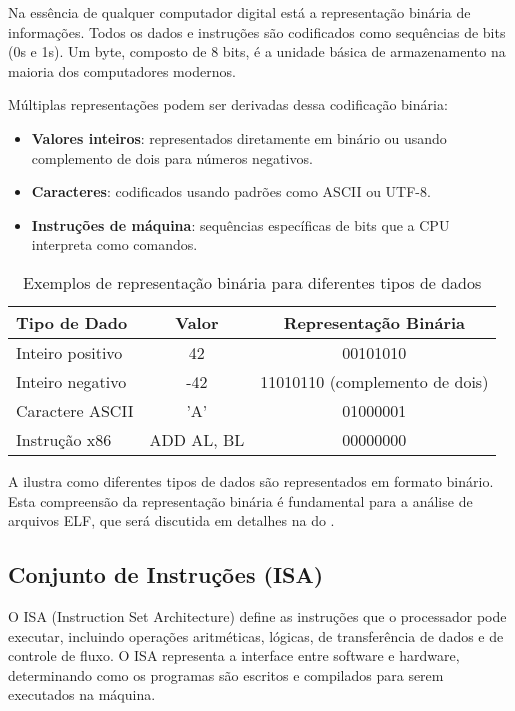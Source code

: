 Na essência de qualquer computador digital está a representação binária de informações. Todos os dados e instruções são codificados como sequências de bits (0s e 1s). Um byte, composto de 8 bits, é a unidade básica de armazenamento na maioria dos computadores modernos.

Múltiplas representações podem ser derivadas dessa codificação binária:
\begin{itemize}
    \item \textbf{Valores inteiros}: representados diretamente em binário ou usando complemento de dois para números negativos.
    \item \textbf{Caracteres}: codificados usando padrões como ASCII ou UTF-8.
    \item \textbf{Instruções de máquina}: sequências específicas de bits que a CPU interpreta como comandos.
\end{itemize}

\begin{table}[ht]
    \centering
    \caption{Exemplos de representação binária para diferentes tipos de dados}
    \label{tab:binary_examples}
    \begin{tabular}{|l|c|c|}
        \hline
        \textbf{Tipo de Dado} & \textbf{Valor} & \textbf{Representação Binária} \\
        \hline
        Inteiro positivo & 42 & 00101010 \\
        Inteiro negativo & -42 & 11010110 (complemento de dois) \\
        Caractere ASCII & 'A' & 01000001 \\
        Instrução x86 & ADD AL, BL & 00000000 \\
        \hline
    \end{tabular}
\end{table}

A  ilustra como diferentes tipos de dados são representados em formato binário. Esta compreensão da representação binária é fundamental para a análise de arquivos ELF, que será discutida em detalhes na  do .

\subsection{Conjunto de Instruções (ISA)}\label{subsec:isa}

O ISA (Instruction Set Architecture) define as instruções que o processador pode executar, incluindo operações aritméticas, lógicas, de transferência de dados e de controle de fluxo. O ISA representa a interface entre software e hardware, determinando como os programas são escritos e compilados para serem executados na máquina.

